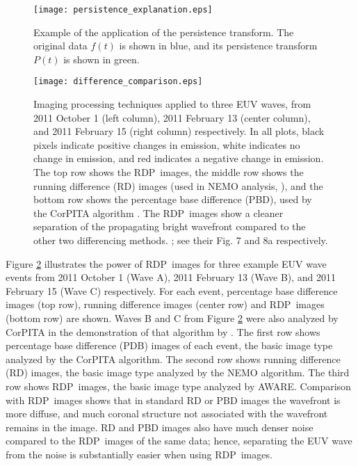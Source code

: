 \documentclass[referee,a4paper,12pt,traditabstract]{swsc}
\newcommand{\RDP}{RDP}
\begin{document}
\begin{linenumbers}
\begin{figure}
\begin{center}
\texttt{[image: persistence\_explanation.eps]}
\caption{Example of the application of the persistence transform.  The
original data $f(t)$ is shown in blue, and its persistence transform
$P(t)$ is shown in green.}
\label{fig:persistence}
\end{center}
\end{figure}

\begin{figure}
\begin{center}
\texttt{[image: difference\_comparison.eps]}
\caption{Imaging processing techniques applied to three EUV waves,
  from 2011 October 1 (left column), 2011 February 13 (center column),
  and 2011 February 15 (right column) respectively. In all plots,
  black pixels indicate positive changes in emission, white indicates
  no change in emission, and red indicates a negative change in
  emission. The top row shows the \RDP\ images, the middle row shows
  the running difference (RD) images (used in NEMO analysis,
  \citep{2005SoPh..228..265P}), and the bottom row shows the
  percentage base difference (PBD), used by the CorPITA algorithm
  \citep{2014SoPh..289.3279L}.  The \RDP\ images show a cleaner
  separation of the propagating bright wavefront compared to the other
  two differencing methods.  \cite{2014SoPh..289.3279L}; see their
  Fig. 7 and 8a respectively.}
\label{rpdm_figure}
\end{center}
\end{figure}

Figure \ref{rpdm_figure} illustrates the power of \RDP\ images for
three example EUV wave events from 2011 October 1 (Wave A), 2011
February 13 (Wave B), and 2011 February 15 (Wave C) respectively. For
each event, percentage base difference images (top row), running
difference images (center row) and \RDP\ images (bottom row) are
shown. Waves B and C from Figure \ref{rpdm_figure} were also analyzed
by CorPITA in the demonstration of that algorithm by
\citet{2014SoPh..289.3279L}.  The first row shows percentage base
difference (PDB) images of each event, the basic image type analyzed
by the CorPITA algorithm.  The second row shows running difference
(RD) images, the basic image type analyzed by the NEMO algorithm.  The
third row shows \RDP\ images, the basic image type analyzed by
AWARE. Comparison with \RDP\ images shows that in standard RD or PBD
images the wavefront is more diffuse, and much coronal structure not
associated with the wavefront remains in the image. RD and PBD images
also have much denser noise compared to the \RDP\ images of the same
data; hence, separating the EUV wave from the noise is substantially
easier when using \RDP\ images.


\end{linenumbers}
\end{document}

